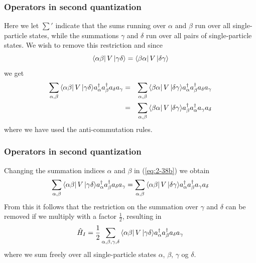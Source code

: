 \frame
{
  \frametitle{Operators in second quantization}
\begin{small}
{\scriptsize
Here we let $\sum'$ indicate that the sums running over $\alpha$ and $\beta$ run over all
single-particle states, while the summations  $\gamma$ and $\delta$ 
run over all pairs of single-particle states. We wish to remove this restriction and since
\begin{equation}
	\element{\alpha\beta}{V}{\gamma\delta} = \element{\beta\alpha}{V}{\delta\gamma} \label{eq:2-37}
\end{equation}
we get
\begin{eqnarray}
	\sum_{\alpha, \beta} \element{\alpha\beta}{V}{\gamma\delta} a^\dagger_\alpha a^\dagger_\beta a_\delta a_\gamma &=& 
		\sum_{\alpha, \beta} \element{\beta\alpha}{V}{\delta\gamma} 
		a^\dagger_\alpha a^\dagger_\beta a_\delta a_\gamma \label{eq:2-38a} \\
	&=& \sum_{\alpha, \beta}\element{\beta\alpha}{V}{\delta\gamma} 
		a^\dagger_\beta a^\dagger_\alpha a_\gamma a_\delta \label{eq:2-38b}
\end{eqnarray}
where we  have used the anti-commutation rules.
}
\end{small}
}



\frame
{
  \frametitle{Operators in second quantization}
\begin{small}
{\scriptsize
Changing the summation indices 
$\alpha$ and $\beta$ in (\ref{eq:2-38b}) we obtain
\begin{equation}
	\sum_{\alpha, \beta} \element{\alpha\beta}{V}{\gamma\delta} a^\dagger_\alpha a^\dagger_\beta a_\delta a_\gamma =
		 \sum_{\alpha, \beta} \element{\alpha\beta}{V}{\delta\gamma} 
		  a^\dagger_\alpha a^\dagger_\beta  a_\gamma a_\delta \label{eq:2-38c}
\end{equation}
From this it follows that the restriction on the summation over $\gamma$ and $\delta$ can be removed if we multiply with a factor $\frac{1}{2}$, resulting in 
\begin{equation}
	\hat{H}_I = \frac{1}{2} \sum_{\alpha, \beta, \gamma, \delta} \element{\alpha\beta}{V}{\gamma\delta}
		a^\dagger_\alpha a^\dagger_\beta a_\delta a_\gamma \label{eq:2-39}
\end{equation}
where we sum freely over all single-particle states $\alpha$, 
$\beta$, $\gamma$ og $\delta$.
}
\end{small}
}

